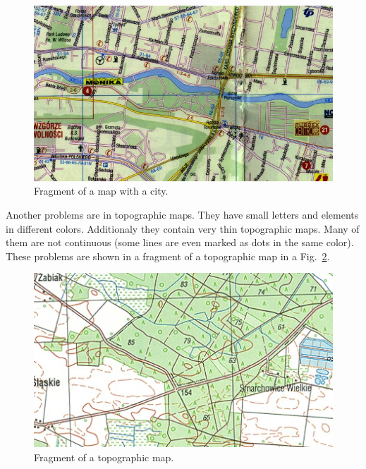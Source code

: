 \documentclass[a4paper,onecolumn,oneside,12pt]{memoir}
\begin{document}
\begin{figure}[!ht]
\begin{center}
\includegraphics[scale=0.65]{images/cityExample.jpg}
\caption{Fragment of a map with a city.}
\label{cityExample}
\end{center}
\end{figure}

Another problems are in topographic maps. They have small letters and elements in different
colors. Additionaly they contain very thin topographic maps. Many of them are not continuous
(some lines are even marked as dots in the same color). These problems are shown in a fragment of a
topographic map in a Fig.~\ref{topographicMapExample}.

\begin{figure}[!ht]
\begin{center}
\includegraphics[scale=2.0]{images/topographicMapExample.jpg}
\caption{Fragment of a topographic map.}
\label{topographicMapExample}
\end{center}
\end{figure}
\end{document}
